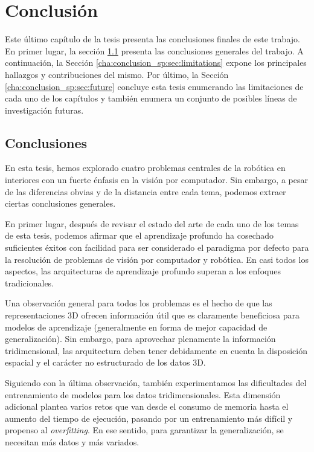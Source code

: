 \chapter{Conclusión}
\label{cha:conclusion_sp}

\begin{chapterabstract}
Este último capítulo de la tesis presenta las conclusiones finales de este trabajo. En primer lugar, la sección \ref{cha:conclusion_sp:sec:findings} presenta las conclusiones generales del trabajo. A continuación, la Sección \ref{cha:conclusion_sp:sec:limitations} expone los principales hallazgos y contribuciones del mismo. Por último, la Sección \ref{cha:conclusion_sp:sec:future} concluye esta tesis enumerando las limitaciones de cada uno de los capítulos y también enumera un conjunto de posibles líneas de investigación futuras.
\end{chapterabstract}

\minitoc

\clearpage

\section{Conclusiones}
\label{cha:conclusion_sp:sec:findings}

En esta tesis, hemos explorado cuatro problemas centrales de la robótica en interiores con un fuerte énfasis en la visión por computador. Sin embargo, a pesar de las diferencias obvias y de la distancia entre cada tema, podemos extraer ciertas conclusiones generales.

En primer lugar, después de revisar el estado del arte de cada uno de los temas de esta tesis, podemos afirmar que el aprendizaje profundo ha cosechado suficientes éxitos con facilidad para ser considerado el paradigma por defecto para la resolución de problemas de visión por computador y robótica. En casi todos los aspectos, las arquitecturas de aprendizaje profundo superan a los enfoques tradicionales.

Una observación general para todos los problemas es el hecho de que las representaciones \ac{3D} ofrecen información útil que es claramente beneficiosa para modelos de aprendizaje (generalmente en forma de mejor capacidad de generalización). Sin embargo, para aprovechar plenamente la información tridimensional, las arquitectura deben tener debidamente en cuenta la disposición espacial y el carácter no estructurado de los datos \ac{3D}.

Siguiendo con la última observación, también experimentamos las dificultades del entrenamiento de modelos para los datos tridimensionales. Esta dimensión adicional plantea varios retos que van desde el consumo de memoria hasta el aumento del tiempo de ejecución, pasando por un entrenamiento más difícil y propenso al \emph{overfitting}. En ese sentido, para garantizar la generalización, se necesitan más datos y más variados.

